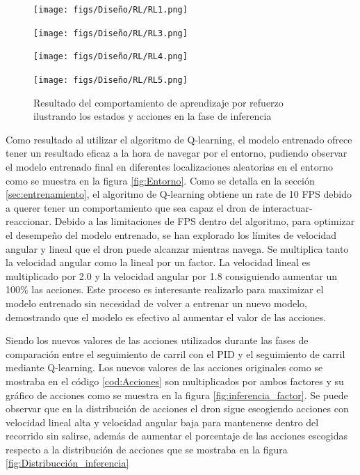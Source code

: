 \begin{figure}[H]
  \centering
  \begin{minipage}{0.3\textwidth}
    \texttt{[image: figs/Diseño/RL/RL1.png]}
  \end{minipage}
  \hfill
  \begin{minipage}{0.3\textwidth}
    \texttt{[image: figs/Diseño/RL/RL3.png]}
  \end{minipage}
  \hfill
  \begin{minipage}{0.3\textwidth}
    \texttt{[image: figs/Diseño/RL/RL4.png]}
  \end{minipage}
  \hfill
  \begin{minipage}{0.3\textwidth}
    \texttt{[image: figs/Diseño/RL/RL5.png]}
  \end{minipage}
  \caption{Resultado del comportamiento de aprendizaje por refuerzo ilustrando los estados y acciones en la fase de inferencia}
  \label{fig:inferencia-imagenes}
\end{figure}

Como resultado al utilizar el algoritmo de Q-learning, el modelo entrenado ofrece tener un resultado eficaz a la hora de navegar por el entorno, pudiendo observar 
el modelo entrenado final en diferentes localizaciones aleatorias en el entorno como se muestra en la figura \ref{fig:Entorno}. Como se detalla en la sección \ref{sec:entrenamiento}, el algoritmo
de Q-learning obtiene un rate de 10 FPS debido a querer tener un comportamiento que sea capaz el dron de interactuar-reaccionar. Debido a las limitaciones de FPS dentro del algoritmo, para optimizar
el desempeño del modelo entrenado, se han explorado los límites de velocidad angular y lineal que el dron puede alcanzar mientras navega. Se multiplica tanto la velocidad angular como la lineal
por un factor. La velocidad lineal es multiplicado por 2.0 y la velocidad angular por 1.8 consiguiendo aumentar un 100\% las acciones. Este proceso es interesante realizarlo para 
maximizar el modelo entrenado sin necesidad de volver a entrenar un nuevo modelo, demostrando que el modelo es efectivo al aumentar el valor de las acciones. \newline

Siendo los nuevos valores de las acciones utilizados durante las fases de comparación entre el seguimiento de carril con el PID y el seguimiento de carril mediante Q-learning. Los nuevos
valores de las acciones originales como se mostraba en el código \ref{cod:Acciones} son multiplicados por ambos factores
y su gráfico de acciones como se muestra en la figura \ref{fig:inferencia_factor}. Se puede observar que en la distribución de acciones el dron
sigue escogiendo acciones con velocidad lineal alta y velocidad angular baja para mantenerse dentro del recorrido sin salirse, además de aumentar el porcentaje de las acciones escogidas respecto a la distribución de acciones
que se mostraba en la figura \ref{fig:Distribucción_inferencia}

